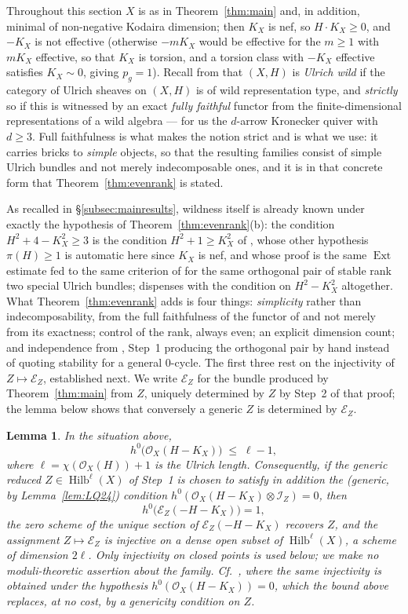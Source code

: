 \documentclass[10pt,a4paper]{amsart}
\newtheorem{lemma}[theorem]{Lemma}
\newcommand{\OO}{\mathcal{O}}
\newcommand{\EE}{\mathcal{E}}
\newcommand{\II}{\mathcal{I}}
\newcommand{\Hilb}{\operatorname{Hilb}}
\newcommand{\Ext}{\operatorname{Ext}}
\newcommand{\len}{\ell}
\begin{document}
Throughout this section $X$ is as in Theorem~\ref{thm:main} and, in addition, minimal of non-negative Kodaira dimension; then $K_X$ is nef, so $H\cdot K_X\ge0$, and $-K_X$ is not effective (otherwise $-mK_X$ would be effective for the $m\ge1$ with $mK_X$ effective, so that $K_X$ is torsion, and a torsion class with $-K_X$ effective satisfies $K_X\sim0$, giving $p_g=1$). Recall from \cite{FPL,CasWild} that $(X,H)$ is \emph{Ulrich wild} if the category of Ulrich sheaves on $(X,H)$ is of wild representation type, and \emph{strictly} so if this is witnessed by an exact \emph{fully faithful} functor from the finite-dimensional representations of a wild algebra --- for us the $d$-arrow Kronecker quiver with $d\ge3$. Full faithfulness is what makes the notion strict and is what we use: it carries bricks to \emph{simple} objects, so that the resulting families consist of simple Ulrich bundles and not merely indecomposable ones, and it is in that concrete form that Theorem~\ref{thm:evenrank} is stated.

As recalled in \S\ref{subsec:mainresults}, wildness itself is already known under exactly the hypothesis of Theorem~\ref{thm:evenrank}(b): the condition $H^2+4-K_X^2\ge3$ is the condition $H^2+1\ge K_X^2$ of \cite[Lem.~5.2]{Cas17}, whose other hypothesis $\pi(H)\ge1$ is automatic here since $K_X$ is nef, and whose proof is the same $\Ext$ estimate fed to the same criterion of \cite{FPL} for the same orthogonal pair of stable rank two special Ulrich bundles; \cite[Thm.~1.3]{Cas17} dispenses with the condition on $H^2-K_X^2$ altogether. What Theorem~\ref{thm:evenrank} adds is four things: \emph{simplicity} rather than indecomposability, from the full faithfulness of the functor of \cite{FPL} and not merely from its exactness; control of the rank, always even; an explicit dimension count; and independence from \cite[Thm.~1.2]{Cas17}, Step~1 producing the orthogonal pair by hand instead of quoting stability for a general $0$-cycle. The first three rest on the injectivity of $Z\mapsto\EE_Z$, established next. We write $\EE_Z$ for the bundle produced by Theorem~\ref{thm:main} from $Z$, uniquely determined by $Z$ by Step~2 of that proof; the lemma below shows that conversely a generic $Z$ is determined by $\EE_Z$.

\begin{lemma}\label{lem:noniso}
In the situation above,
\[
h^0\bigl(\OO_X(H-K_X)\bigr)\;\le\;\len-1 ,
\]
where $\len=\chi(\OO_X(H))+1$ is the Ulrich length. Consequently, if the generic reduced $Z\in\Hilb^{\len}(X)$ of Step~1 is chosen to satisfy in addition the (generic, by Lemma~\ref{lem:LQ24}) condition $h^0(\OO_X(H-K_X)\otimes\II_Z)=0$, then
\[
h^0\bigl(\EE_Z(-H-K_X)\bigr)=1 ,
\]
the zero scheme of the unique section of $\EE_Z(-H-K_X)$ recovers $Z$, and the assignment $Z\mapsto\EE_Z$ is injective on a dense open subset of $\Hilb^{\len}(X)$, a scheme of dimension $2\len$. Only injectivity on closed points is used below; we make no moduli-theoretic assertion about the family. Cf.\ \cite[Rem.~4.5]{Cas17}, where the same injectivity is obtained under the hypothesis $h^0(\OO_X(H-K_X))=0$, which the bound above replaces, at no cost, by a genericity condition on $Z$.
\end{lemma}
\end{document}
